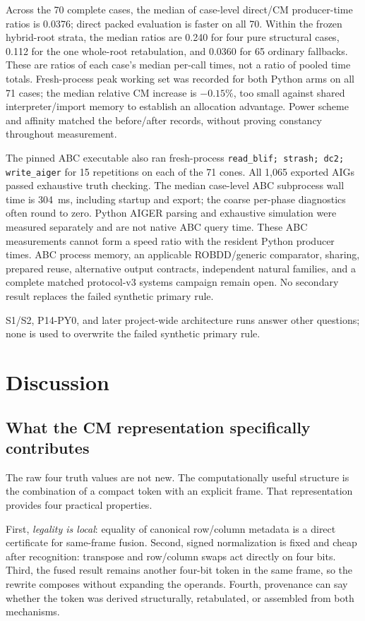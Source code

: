 \documentclass[10pt]{article}
\theoremstyle{plain}
\theoremstyle{definition}
\theoremstyle{remark}
\begin{document}
Across the 70 complete cases, the median of case-level direct/CM producer-time ratios is 0.0376; direct packed evaluation is faster on all 70. Within the frozen hybrid-root strata, the median ratios are 0.240 for four pure structural cases, 0.112 for the one whole-root retabulation, and 0.0360 for 65 ordinary fallbacks. These are ratios of each case's median per-call times, not a ratio of pooled time totals. Fresh-process peak working set was recorded for both Python arms on all 71 cases; the median relative CM increase is $-0.15\%$, too small against shared interpreter/import memory to establish an allocation advantage. Power scheme and affinity matched the before/after records, without proving constancy throughout measurement.

The pinned ABC executable also ran fresh-process \texttt{read\_blif; strash; dc2; write\_aiger} for 15 repetitions on each of the 71 cones. All 1,065 exported AIGs passed exhaustive truth checking. The median case-level ABC subprocess wall time is 304~ms, including startup and export; the coarse per-phase diagnostics often round to zero. Python AIGER parsing and exhaustive simulation were measured separately and are not native ABC query time. These ABC measurements cannot form a speed ratio with the resident Python producer times. ABC process memory, an applicable ROBDD/generic comparator, sharing, prepared reuse, alternative output contracts, independent natural families, and a complete matched protocol-v3 systems campaign remain open. No secondary result replaces the failed synthetic primary rule.

S1/S2, P14-PY0, and later project-wide architecture runs answer other questions; none is used to overwrite the failed synthetic primary rule.

\section{Discussion}
\label{sec:discussion}

\subsection{What the CM representation specifically contributes}

The raw four truth values are not new. The computationally useful structure is the combination of a compact token with an explicit frame. That representation provides four practical properties.

First, \emph{legality is local}: equality of canonical row/column metadata is a direct certificate for same-frame fusion. Second, signed normalization is fixed and cheap after recognition: transpose and row/column swaps act directly on four bits. Third, the fused result remains another four-bit token in the same frame, so the rewrite composes without expanding the operands. Fourth, provenance can say whether the token was derived structurally, retabulated, or assembled from both mechanisms.
\end{document}
